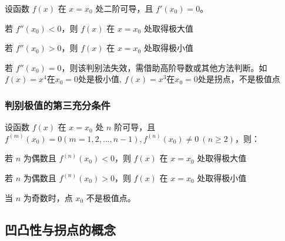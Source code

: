 \documentclass[a4paper,12pt]{article}
\begin{document}
    \begin{theorem}
        设函数 $f(x)$ 在 $x=x_0$ 处二阶可导，且 $f'(x_0)=0$。
        \begin{circlenum}
            \item 若 $f''(x_0)<0$，则 $f(x)$ 在 $x=x_0$ 处取得极大值
            \item 若 $f''(x_0)>0$，则 $f(x)$ 在 $x=x_0$ 处取得极小值
            \item 若 $f''(x_0)=0$，则该判别法失效，需借助高阶导数或其他方法判断。如$f(x) = x^4$在$x_0 = 0$处是极小值, $f(x) = x^3$在$x_0 = 0$处是拐点，不是极值点
        \end{circlenum}
    \end{theorem}

    \subsubsection{判别极值的第三充分条件}

    \begin{theorem}
        设函数 $f(x)$ 在 $x=x_0$ 处 $n$ 阶可导，且$f^{(m)}(x_0)=0 (m=1,2,\ldots,n-1), f^{(n)}(x_0)\neq 0 \ (n\ge 2)$，则：
        \begin{circlenum}
            \item 若 $n$ 为偶数且 $f^{(n)}(x_0)<0$，则 $f(x)$ 在 $x=x_0$ 处取得极大值
            \item 若 $n$ 为偶数且 $f^{(n)}(x_0)>0$，则 $f(x)$ 在 $x=x_0$ 处取得极小值
        \end{circlenum}
        当 $n$ 为奇数时，点 $x_0$ 不是极值点。
    \end{theorem}

    \subsection{凹凸性与拐点的概念}
\end{document}
